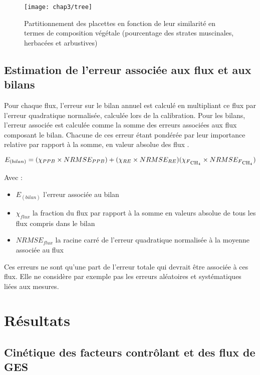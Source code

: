 \begin{figure}[t]
\centering
\texttt{[image: chap3/tree]}
\caption{Partitionnement des placettes en fonction de leur similarité en termes de composition végétale (pourcentage des strates muscinales, herbacées et arbustives)}
\label{fig:tree}
\end{figure}


\subsection{Estimation de l'erreur associée aux flux et aux bilans}

Pour chaque flux, l'erreur sur le bilan annuel est calculé en multipliant ce flux par l'erreur quadratique normalisée, calculée lors de la calibration.
Pour les bilans, l'erreur associée est calculée comme la somme des erreurs associées aux flux composant le bilan.
Chacune de ces erreur étant pondérée par leur importance relative par rapport à la somme, en valeur absolue des flux \citep{waddington2000}.

\begin{equation}
E_{(bilan)} = (\chi_{PPB} \times NRMSE_{PPB}) + (\chi_{RE} \times NRMSE_{RE}) (\chi_{F\textsubscript{CH\textsubscript{4}}} \times NRMSE_{F\textsubscript{CH\textsubscript{4}}})
\end{equation}

Avec : 
\begin{itemize}
\item $E_{(bilan)}$ l'erreur associée au bilan
\item $\chi_{flux}$ la fraction du flux par rapport à la somme en valeurs absolue de tous les flux compris dans le bilan
\item $NRMSE_{flux}$ la racine carré de l'erreur quadratique normalisée à la moyenne associée au flux
\end{itemize}

Ces erreurs ne sont qu'une part de l'erreur totale qui devrait être associée à ces flux. Elle ne considère par exemple pas les erreurs aléatoires et systématiques liées aux mesures.


\section{Résultats}

\subsection{Cinétique des facteurs contrôlant et des flux de GES}

